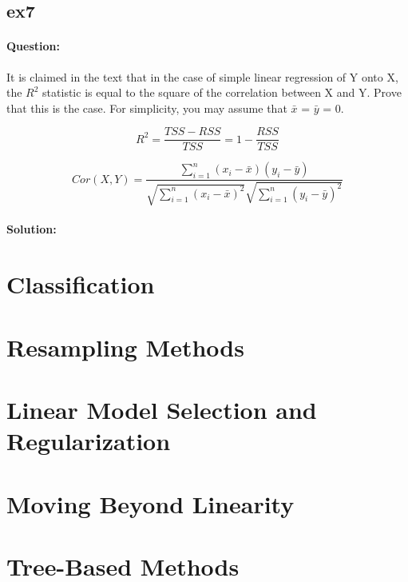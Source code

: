 \documentclass[a4paper,12pt,titlepage]{article} %
\begin{document}
\subsection{ex7}
\paragraph{Question:} It is claimed in the text that in the case of simple linear regression of Y onto X, the $R^{2}$ statistic is equal to the square of the correlation between X and Y. Prove that this is the case. For simplicity, you may assume that $\bar{x}$ = $\bar{y}$ = 0.

$$ R^{2} = \frac{TSS - RSS}{TSS} = 1 - \frac{RSS}{TSS} $$

$$ Cor(X,Y) = \frac{\sum_{i=1}^{n} (x_{i}-\bar{x}) (y_{i}-\bar{y})} {\sqrt{\sum_{i=1}^{n} (x_{i}-\bar{x})^{2}} \sqrt{\sum_{i=1}^{n} (y_{i}-\bar{y})^{2}}}$$

\paragraph{Solution:}


\newpage
\section{Classification}


\newpage
\section{Resampling Methods}


\newpage
\section{Linear Model Selection and Regularization}


\newpage
\section{Moving Beyond Linearity}


\newpage
\section{Tree-Based Methods}
\end{document}
